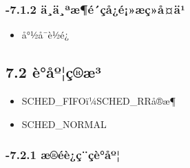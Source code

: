 \documentclass[11pt]{article}
\begin{document}
\subsubsection{-7.1.2 ä¸ä¸ªæ¶é´çå¿é¡»æç»­å¤ä¹}
\label{sec-2.1.2}

\begin{itemize}
\item å°½å¯è½é¿
\end{itemize}
\subsection{7.2 è°åº¦ç®æ³}
\label{sec-2.2}

\begin{itemize}
\item SCHED\_FIFOï¼SCHED\_RRå®æ¶
\item SCHED\_NORMAL
\end{itemize}
\subsubsection{-7.2.1 æ®éè¿ç¨çè°åº¦}
\label{sec-2.2.1}
\end{document}
